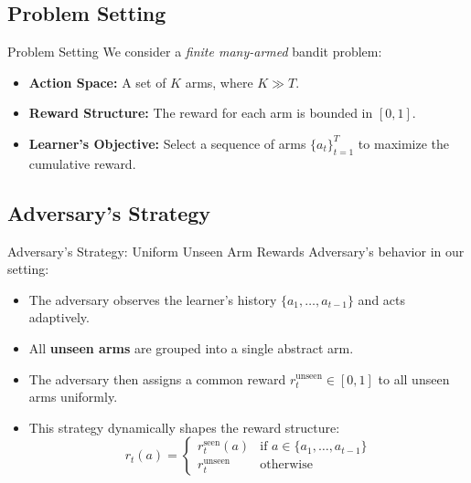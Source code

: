 \documentclass{beamer}
\begin{document}
\subsection{Problem Setting}
\begin{frame}{Problem Setting}
    We consider a \textit{finite many-armed} bandit problem:

    \begin{itemize}
        \item \textbf{Action Space:} A set of $K$ arms, where $K \gg T$.
        \item \textbf{Reward Structure:} The reward for each arm is bounded in $[0, 1]$.
        \item \textbf{Learner's Objective:} Select a sequence of arms $\{a_t\}_{t=1}^T$ to maximize the cumulative reward.
    \end{itemize}
\end{frame}


\subsection{Adversary’s Strategy}
\begin{frame}{Adversary’s Strategy: Uniform Unseen Arm Rewards}
    Adversary's behavior in our setting:

    \begin{itemize}
        \item The adversary observes the learner’s history $\{a_1, \dots, a_{t-1}\}$ and acts adaptively.
        \item All \textbf{unseen arms} are grouped into a single abstract arm.
        \item The adversary then assigns a common reward $r_t^{\text{unseen}} \in [0,1]$ to all unseen arms uniformly.
        \item This strategy dynamically shapes the reward structure:
        \[
            r_t(a) =
            \begin{cases}
                r_t^{\text{seen}}(a) & \text{if } a \in \{a_1, \dots, a_{t-1}\} \\
                r_t^{\text{unseen}} & \text{otherwise}
            \end{cases}
        \]
    \end{itemize}
\end{frame}
\end{document}

